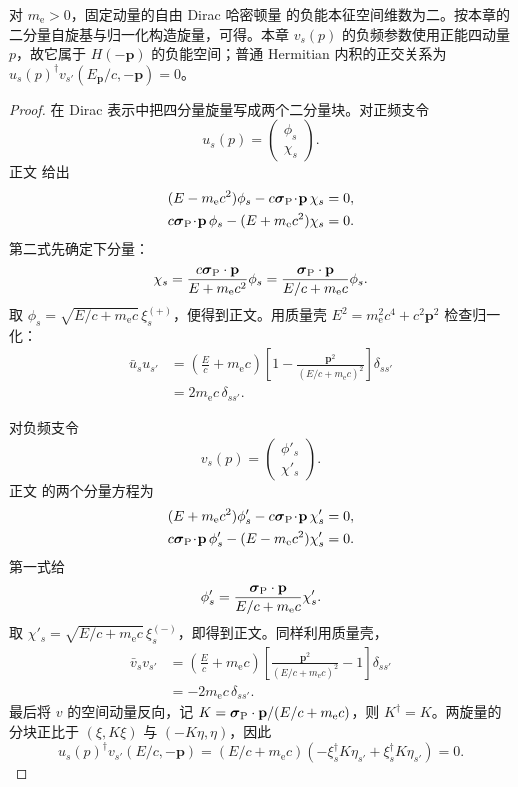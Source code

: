 \begin{proposition}[自由负能旋量的构造]
对 $m_{\mathrm e}>0$，固定动量的自由 Dirac 哈密顿量 的负能本征空间维数为二。按本章的二分量自旋基与归一化构造旋量，可得。本章 $v_s(p)$ 的负频参数使用正能四动量 $p$，故它属于 $H(-\mathbf p)$ 的负能空间；普通 Hermitian 内积的正交关系为 $u_s(p)^\dagger v_{s'}(E_{\mathbf p}/c,-\mathbf p)=0$。
\end{proposition}
\begin{proof}
在 Dirac 表示中把四分量旋量写成两个二分量块。对正频支令
\[
u_s(p)=\begin{pmatrix}\phi_s\\ \chi_s\end{pmatrix}.
\]
正文 给出
\begin{align*}
(E-m_{\mathrm e} c^2)\phi_s
-c\boldsymbol\sigma_{\rm P}\!\cdot\!\mathbf p\,\chi_s&=0,\\
c\boldsymbol\sigma_{\rm P}\!\cdot\!\mathbf p\,\phi_s
-(E+m_{\mathrm e} c^2)\chi_s&=0.
\end{align*}
第二式先确定下分量：
\[
\chi_s
=\frac{c\boldsymbol\sigma_{\rm P}\cdot\mathbf p}{E+m_{\mathrm e} c^2}\phi_s
=\frac{\boldsymbol\sigma_{\rm P}\cdot\mathbf p}{E/c+m_{\mathrm e} c}\phi_s.
\]
取
$\phi_s=\sqrt{E/c+m_{\mathrm e} c}\,\xi_s^{(+)}$，便得到正文。用质量壳 $E^2=m_{\mathrm e}^2c^4+c^2\mathbf p^2$ 检查归一化：
\begin{align*}
\bar u_su_{s'}
&=\left(\frac Ec+m_{\mathrm e} c\right)
\left[
1-\frac{\mathbf p^2}{(E/c+m_{\mathrm e} c)^2}
\right]\delta_{ss'}\\
&=2m_{\mathrm e} c\,\delta_{ss'}.
\end{align*}

对负频支令
\[
v_s(p)=\begin{pmatrix}\phi'_s\\ \chi'_s\end{pmatrix}.
\]
正文 的两个分量方程为
\begin{align*}
(E+m_{\mathrm e} c^2)\phi'_s
-c\boldsymbol\sigma_{\rm P}\!\cdot\!\mathbf p\,\chi'_s&=0,\\
c\boldsymbol\sigma_{\rm P}\!\cdot\!\mathbf p\,\phi'_s
-(E-m_{\mathrm e} c^2)\chi'_s&=0.
\end{align*}
第一式给
\[
\phi'_s
=\frac{\boldsymbol\sigma_{\rm P}\cdot\mathbf p}{E/c+m_{\mathrm e} c}\chi'_s.
\]
取
$\chi'_s=\sqrt{E/c+m_{\mathrm e} c}\,\xi_s^{(-)}$，即得到正文。同样利用质量壳，
\begin{align*}
\bar v_sv_{s'}
&=\left(\frac Ec+m_{\mathrm e} c\right)
\left[
\frac{\mathbf p^2}{(E/c+m_{\mathrm e} c)^2}-1
\right]\delta_{ss'}\\
&=-2m_{\mathrm e} c\,\delta_{ss'}.
\end{align*}
最后将 $v$ 的空间动量反向，记 $K=\boldsymbol\sigma_{\rm P}\cdot\mathbf p/(E/c+m_{\mathrm e}c)$，则 $K^\dagger=K$。两旋量的分块正比于 $(\xi,K\xi)$ 与 $(-K\eta,\eta)$，因此
\[
u_s(p)^\dagger v_{s'}(E/c,-\mathbf p)
=\left(E/c+m_{\mathrm e}c\right)(-\xi_s^\dagger K\eta_{s'}+\xi_s^\dagger K\eta_{s'})=0.
\]
\end{proof}

